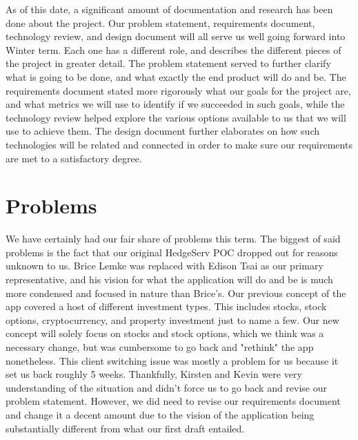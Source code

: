 \documentclass[letterpaper,10pt,titlepage,journal,compsoc,draftclsnofoot,onecolumn]{IEEEtran}
\begin{document}
As of this date, a significant amount of documentation and research has been done about the project. Our problem statement, requirements document, technology review, and design document will all serve us well going forward into Winter term. Each one has a different role, and describes the different pieces of the project in greater detail. The problem statement served to further clarify what is going to be done, and what exactly the end product will do and be. The requirements document stated more rigorously what our goals for the project are, and what metrics we will use to identify if we succeeded in such goals, while the technology review helped explore the various options available to us that we will use to achieve them. The design document further elaborates on how such technologies will be related and connected in order to make sure our requirements are met to a satisfactory degree.

\section{Problems}
We have certainly had our fair share of problems this term. The biggest of said problems is the fact that our original HedgeServ POC dropped out for reasons unknown to us. Brice Lemke was replaced with Edison Tsai as our primary representative, and his vision for what the application will do and be is much more condensed and focused in nature than Brice's. Our previous concept of the app covered a host of different investment types. This includes stocks, stock options, cryptocurrency, and property investment just to name a few. Our new concept will solely focus on stocks and stock options, which we think was a necessary change, but was cumbersome to go back and "rethink" the app nonetheless. This client switching issue was mostly a problem for us because it set us back roughly 5 weeks. Thankfully, Kirsten and Kevin were very understanding of the situation and didn't force us to go back and revise our problem statement. However, we did need to revise our requirements document and change it a decent amount due to the vision of the application being substantially different from what our first draft entailed. 
\end{document}
